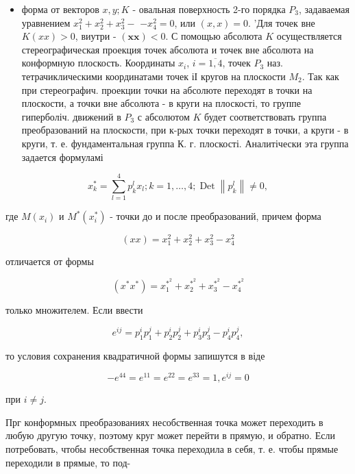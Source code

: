 \documentclass[10pt]{article}
\begin{document}
\begin{itemize}

  \item форма от векторов $x, y ; K$ - овальная поверхность 2-го порядка $P_{3}$, задаваемая уравнением $x_{1}^{2}+x_{2}^{2}+x_{3}^{2}-$ $-x_{4}^{2}=0$, или $(x, x)=0$. 'Для точек вне $K(x x)>0$, виутри - $(\boldsymbol{x} \boldsymbol{x})<0$. С помощью абсолюта $K$ осуществляется стереографическая проекция точек абсолюта и точек вне абсолюта на конформную плоскость. Координаты $x_{i}$, $i=\overline{1,4}$, точек $P_{3}$ наз. тетрачиклическими координатами точек іІ кругов на плоскости $M_{2}$. Так как при стереографич. проекции точки на абсолюте переходят в точки на плоскости, а точки вне абсолюта - в круги на плоскості, то группе гиперболіч. движений в $P_{3}$ с абсолютом $K$ будет соответствовать группа преобразований на плоскости, при к-рых точки переходят в точки, а круги - в круги, т. е. фундаментальная группа К. г. плоскості. Аналитічески эта группа задается формуламі

\end{itemize}



\[

x_{k}^{*}=\sum_{l=1}^{4} p_{k}^{l} x_{l} ; k=1, \ldots, 4 ; \operatorname{Det}\left\|p_{k}^{l}\right\| \neq 0,

\]



где $M\left(x_{i}\right)$ и $M^{*}\left(x_{i}^{*}\right)$ - точки до и после преобразований, причем форма



\[

(x x)=x_{1}^{2}+x_{2}^{2}+x_{3}^{2}-x_{4}^{2}

\]



отличается от формы



\[

\left(x^{*} x^{*}\right)=x_{1}^{*^{2}}+x_{2}^{*^{2}}+x_{3}^{*^{2}}-x_{4}^{*^{2}}

\]



только множителем. Если ввести



\[

e^{i j}=p_{1}^{i} p_{1}^{j}+p_{2}^{i} p_{2}^{j}+p_{3}^{i} p_{3}^{j}-p_{4}^{i} p_{4}^{j},

\]



то условия сохранения квадратичной формы запишутся в віде



\[

-e^{44}=e^{11}=e^{22}=e^{33}=1, e^{i j}=0

\]



при $i \neq j$.



Прг конформных преобразованиях несобственная точка может переходить в любую другую точку, поэтому круг может перейти в прямую, и обратно. Если потребовать, чтобы несобственная точка переходила в себя, т. е. чтобы прямые переходили в прямые, то под-
\end{document}
